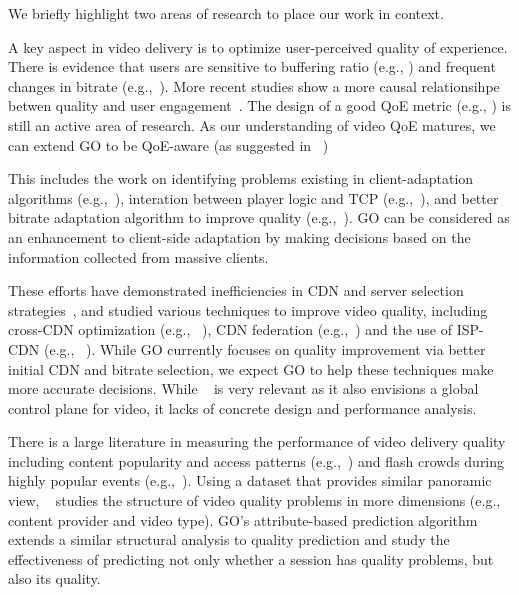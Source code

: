 We briefly highlight two areas of research to place our work in context.

A key aspect in  video delivery is to optimize user-perceived  quality of experience.  There is evidence that
users are sensitive to buffering ratio (e.g., \cite{sigcomm11}) and frequent changes in bitrate (e.g.,~\cite{user-adaptive,videoqoe}). More recent studies show a more causal relationsihpe betwen quality and user engagement~\cite{akamai-imc12}. The design of a good QoE metric (e.g., \cite{qscore}) is still an active area of research. As our understanding of video QoE matures, we can extend GO to be QoE-aware (as suggested in ~\cite{sekar2012quest})

 This includes the work on identifying problems existing in client-adaptation algorithms (e.g.,~\cite{mmsys2011cisco}), interation between player logic and TCP (e.g.,~\cite{usenix12_ghobadi,nossdav12_esteban}), and better bitrate adaptation algorithm to improve quality (e.g.,~\cite{nossdav12_akhshabi,festive}). GO can be considered as an enhancement to client-side adaptation by making decisions based on the information collected from massive clients.

 These efforts have demonstrated inefficiencies in CDN and server selection strategies~\cite{youtubecdn,youtube-infra}, and studied various techniques to improve video quality, including cross-CDN optimization (e.g., ~\cite{sigcomm12cdnmulti}), CDN federation (e.g.,~\cite{peterson2013framework}) and the use of ISP-CDN (e.g., ~\cite{yu2012tradeoffs,frank2013pushing}).  While GO currently focuses on quality improvement via better initial CDN and bitrate selection, we expect GO to help these techniques make more accurate decisions. While ~\cite{sigcomm12} is very relevant as it also envisions a global control plane for video, it lacks of concrete design and performance analysis. 

  There is a large  literature in measuring the performance of video delivery quality including content popularity and access patterns (e.g.,~\cite{youtube-imc07}\cite{plissonneau2012longitudinal}) and flash crowds during highly popular events (e.g.,~\cite{beijing-imc09}). Using a dataset that provides similar panoramic view, ~\cite{jiang2013shedding} studies the structure of video quality problems in more dimensions (e.g., content provider and video type). GO's attribute-based prediction algorithm extends a similar structural analysis to quality prediction and study the effectiveness of predicting not only whether a session has quality problems, but also its quality.

